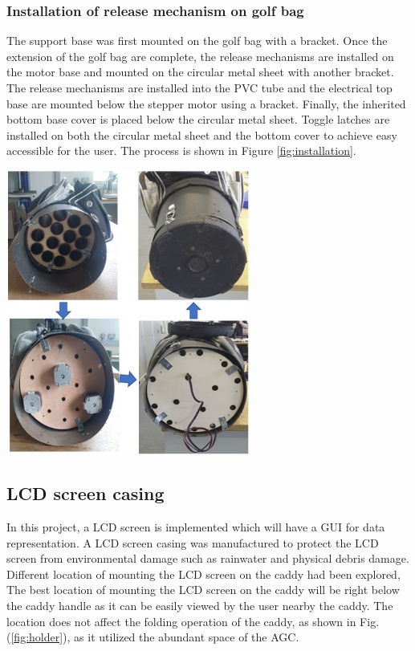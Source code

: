 \documentclass[11pt,landscape]{article}
\newenvironment{Figure}
  {\par\medskip\noindent\minipage{\linewidth}}
  {\endminipage\par\medskip}
\begin{document}
\begin{multicols}{3}
    \subsubsection{Installation of release mechanism on golf bag }
    The support base was first mounted on the golf bag with a bracket. Once the
    extension of the golf bag are complete, the release mechanisms are installed
    on the motor base and mounted on the circular metal sheet with another
    bracket. The release mechanisms are installed into the PVC tube and the
    electrical top base are mounted below the stepper motor using a bracket.
    Finally, the inherited bottom base cover is placed below the circular
    metal sheet. Toggle latches are installed on both the circular metal sheet
    and the bottom cover to achieve easy accessible for the user. The process is
    shown in Figure \ref{fig:installation}.
    \begin{Figure}
        \begin{center}
            \includegraphics[width=0.6\textwidth]{Figure30.jpg}
            \label{fig:installation}
        \end{center}
    \end{Figure}

    \subsection{LCD screen casing}
    In this project, a LCD screen is implemented which will have a GUI for data
    representation. A LCD screen casing was manufactured to protect the LCD
    screen from environmental damage such as rainwater and physical debris
    damage. Different location of mounting the LCD screen on the caddy had been
    explored, The best location of mounting the LCD screen on the caddy will be
    right below the caddy handle as it can be easily viewed by the user nearby
    the caddy. The location does not affect the folding operation of the caddy,
    as shown in Fig. (\ref{fig:holder}), as it utilized the abundant space of
    the AGC. 
    

\end{multicols}
\end{document}
